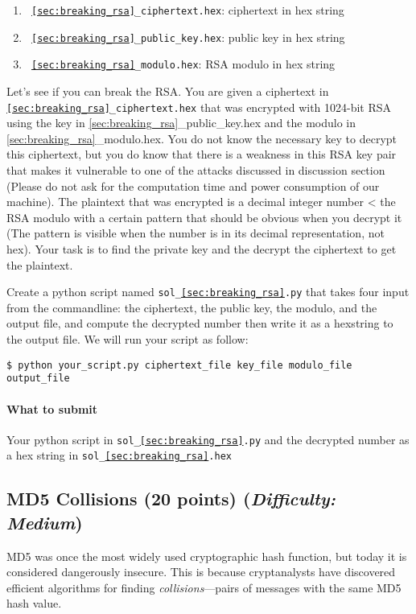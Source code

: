 \documentclass[letterpaper,12pt]{report}
\begin{document}
\begin{enumerate}
\item \texttt { \ref{sec:breaking_rsa}\_ciphertext.hex}: ciphertext in hex string
\item \texttt { \ref{sec:breaking_rsa}\_public\_key.hex}: public key in hex string
\item \texttt { \ref{sec:breaking_rsa}\_modulo.hex}: RSA modulo in hex string
\end{enumerate}

Let's see if you can break the RSA.  You are given a ciphertext in \texttt{\ref{sec:breaking_rsa}\_ciphertext.hex} that was encrypted with 1024-bit RSA using the key in {\ref{sec:breaking_rsa}\_public\_key.hex} and the modulo in {\ref{sec:breaking_rsa}\_modulo.hex}. You do not know the necessary key to decrypt this ciphertext, but you do know that there is a weakness in this RSA key pair that makes it vulnerable to one of the attacks discussed in discussion section (Please do not ask for the computation time and power consumption of our machine). The plaintext that was encrypted is a decimal integer number < the RSA modulo with a certain pattern that should be obvious when you decrypt it (The pattern is visible when the number is in its decimal representation, not hex).  Your task is to find the private key and the decrypt the ciphertext to get the plaintext.

\medskip

Create a python script named \texttt{sol\_\ref{sec:breaking_rsa}.py} that takes four input from the commandline: the ciphertext, the public key, the modulo, and the output file, and compute the decrypted number then write it as a hexstring to the output file. We will run your script as follow:
\begin{mdframed}
\begin{verbatim}
$ python your_script.py ciphertext_file key_file modulo_file output_file
\end{verbatim}
\end{mdframed}
 
 \paragraph{What to submit}
Your python script in \texttt{sol\_\ref{sec:breaking_rsa}.py} and the decrypted number as a hex string in \texttt{sol\_\ref{sec:breaking_rsa}.hex}


\subsection{MD5 Collisions (20 points)  \hfill\rm\normalsize (\emph{Difficulty: Medium})}
\label{sec:md5_collision}
MD5 was once the most widely used cryptographic hash function, but today it is considered dangerously insecure.  This is because cryptanalysts have discovered efficient algorithms for finding \emph{collisions}---pairs of messages with the same MD5 hash value.
 
\end{document}
